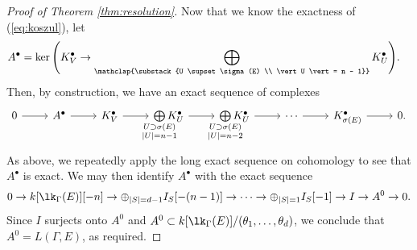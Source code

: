 \begin{proof}[Proof of Theorem \ref{thm:resolution}]
Now that we know the exactness of (\ref{eq:koszul}), let 
\begin{equation*} \begin{split}
A^{\bullet} &= \ker \Bigg( K_{V}^{\bullet} \to \bigoplus\limits_{\mathclap{\substack{U \supset \sigma(E) \\ \vert U \vert = n - 1}}} K_U^{\bullet} \Bigg).
\end{split}\end{equation*}
Then, by construction, we have an exact sequence of complexes 
\begin{equation*}
\begin{tikzcd}
0 \arrow[r] & A^{\bullet} \arrow[r] &K_{V}^{\bullet} \arrow[r] & \bigoplus\limits_{\mathclap{\substack{U \supset \sigma(E) \\ \vert U \vert = n - 1}}} K_U^{\bullet} \arrow[r] & \bigoplus\limits_{\mathclap{\substack{U \supset \sigma(E) \\ \vert U \vert = n - 2}}} K_U^{\bullet} \arrow[r] & \cdots \arrow[r] & K_{\sigma(E)}^{\bullet} \arrow[r] & 0.
\end{tikzcd}
\end{equation*}
As above, we repeatedly apply the long exact sequence on cohomology to see that $A^{\bullet}$ is exact. 
We may then identify $A^{\bullet}$ with the exact sequence
$$0  \to k[\lk_{\Gamma}(E)][-n] \to \oplus_{ |S|  = d - 1 } I_{S}[-(n-1)] \to \dotsb  \to \oplus_{|S| = 1} I_{S}[-1] \to I \to A^0 \to 0.$$ Since $I$ surjects onto $A^0$ and $A^0 \subset k[\lk_{\Gamma}(E)]/(\theta_1, \dotsc, \theta_{d})$, we conclude that $A^0 = L(\Gamma,E)$, as required.
\end{proof}
